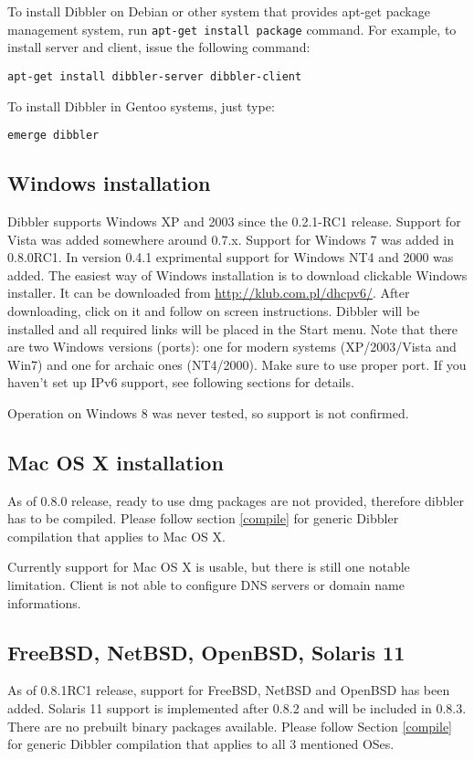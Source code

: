 To install Dibbler on Debian or other system that provides apt-get
package management system, run \verb+apt-get install package+
command. For example, to install server and client, issue the
following command:

\begin{lstlisting}
apt-get install dibbler-server dibbler-client
\end{lstlisting}

To install Dibbler in Gentoo systems, just type:
\begin{lstlisting}
emerge dibbler
\end{lstlisting}

\subsection{Windows installation}
Dibbler supports Windows XP and 2003 since the 0.2.1-RC1 release.
Support for Vista was added somewhere around 0.7.x. Support for
Windows 7 was added in 0.8.0RC1. In version 0.4.1 exprimental support
for Windows NT4 and 2000 was added. The easiest way of Windows
installation is to download clickable Windows installer. It can be
downloaded from \url{http://klub.com.pl/dhcpv6/}. After downloading,
click on it and follow on screen instructions. Dibbler will be
installed and all required links will be placed in the Start
menu. Note that there are two Windows versions (ports): one for modern
systems (XP/2003/Vista and Win7) and one for archaic ones
(NT4/2000). Make sure to use proper port. If you haven't set up IPv6
support, see following sections for details.

Operation on Windows 8 was never tested, so support is not confirmed.

\subsection{Mac OS X installation}
As of 0.8.0 release, ready to use dmg packages are not provided,
therefore dibbler has to be compiled. Please follow section
\ref{compile} for generic Dibbler compilation that applies to Mac OS
X.

Currently support for Mac OS X is usable, but there is still one
notable limitation. Client is not able to configure DNS servers or
domain name informations.

\subsection{FreeBSD, NetBSD, OpenBSD, Solaris 11}
As of 0.8.1RC1 release, support for FreeBSD, NetBSD and OpenBSD has
been added. Solaris 11 support is implemented after 0.8.2 and will be included
in 0.8.3. There are no prebuilt binary packages available. Please
follow Section \ref{compile} for generic Dibbler compilation that applies to
all 3 mentioned OSes.


